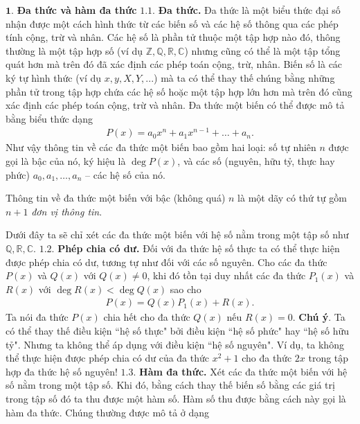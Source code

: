 \begin{multicols}{2}
	$\pmb{1.}$ \textbf{\color{hoccungpi}Đa thức và hàm đa thức} 
	\vskip 0.1cm
	$\pmb{1.1.}$ \textbf{\color{hoccungpi}Đa thức.}
	Đa thức là một biểu thức đại số nhận được một cách hình thức từ các { biến số} và các { hệ số} thông qua các phép tính cộng, trừ và nhân. 
	\vskip 0.1cm
	Các hệ số là phần tử thuộc một tập hợp nào đó, thông thường là một tập hợp số (ví dụ $\mathbb {Z, Q, R, C}$) nhưng cũng có thể là một tập tổng quát hơn mà trên đó đã xác định các phép toán cộng, trừ, nhân. 
	\vskip 0.1cm
	Biến số là các ký tự hình thức (ví dụ $x,y,X,Y,...$) mà ta có thể thay thế chúng bằng những phần tử trong tập hợp chứa các hệ số hoặc một tập hợp lớn hơn mà trên đó cũng xác định các phép toán cộng, trừ và nhân.
	\vskip 0.1cm
	Đa thức một biến có thể được mô tả bằng biểu thức dạng
	\begin{align*}
		P(x)=a_0x^n+a_1x^{n-1}+\ldots+a_n.
	\end{align*}
	Như vậy thông tin về các đa thức một biến bao gồm hai loại: số tự nhiên $n$ được gọi là bậc của nó, ký hiệu là $\deg P(x)$, và các số (nguyên, hữu tỷ, thực hay phức) $a_0,a_1,\ldots, a_n$ -- các hệ số của nó. 
	\begin{tBox}
		Thông tin về đa thức một biến với bậc (không quá) $n$ là một dãy có thứ tự gồm $n+1$ {\em đơn vị thông tin}.
	\end{tBox}
	Dưới đây ta sẽ chỉ xét các { đa thức một biến} với hệ số nằm trong một tập số như $\mathbb{Q, R, C}$. 
	\vskip 0.1cm	
	$\pmb{1.2.}$ \textbf{\color{hoccungpi}Phép chia có dư.}  
	Đối với đa thức hệ số thực ta có thể thực hiện được phép chia có dư, tương tự như đối với các số nguyên. Cho các đa thức $P(x)$ và $Q(x)$ với $Q(x)\neq 0$, khi đó tồn tại duy nhất các đa thức $P_1(x)$ và $R(x)$ với $\deg R(x)<\deg Q(x)$ sao cho
	\begin{align*}
		P(x)= Q(x)P_1(x)+R(x).
	\end{align*}
	Ta nói đa thức $P(x)$ chia hết cho đa thức $Q(x)$ nếu $R(x)=0$.   
	\vskip 0.1cm
	\textbf{\color{hoccungpi}Chú ý}. Ta có thể thay thế điều kiện ``hệ số thực" bởi điều kiện ``hệ số phức" hay ``hệ số hữu tỷ". Nhưng ta không thể áp dụng với điều kiện ``hệ số nguyên". 
	\vskip 0.1cm
	Ví dụ, ta không thể thực hiện được phép chia có dư của đa thức $x^2+1$ cho đa thức $2x$ {trong tập hợp đa thức hệ số nguyên}!
	\vskip 0.1cm
	$\pmb{1.3.}$ \textbf{\color{hoccungpi}Hàm đa thức.}
	Xét các đa thức một biến với hệ số nằm trong một tập số. Khi đó, bằng cách thay thế biến số bằng các giá trị trong tập số đó ta thu được một hàm số. Hàm số thu được bằng cách này gọi là {hàm đa thức}. Chúng thường được mô tả ở dạng

\end{multicols}

